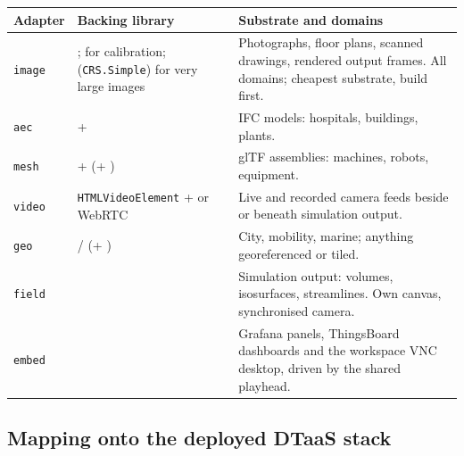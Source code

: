 \begin{longtable}{@{}L{1.9cm}L{5.2cm}L{7.4cm}@{}}
\toprule
\textbf{Adapter} & \textbf{Backing library} & \textbf{Substrate and domains} \\
\midrule
\endhead
\texttt{image} & ;  for calibration; 
(\texttt{CRS.Simple}) for very large images & Photographs, floor plans, scanned
drawings, rendered output frames. All domains; cheapest substrate, build first. \\
\addlinespace
\texttt{aec} &  +  & IFC models:
hospitals, buildings, plants. \\
\addlinespace
\texttt{mesh} &  +  (+ ) & glTF
assemblies: machines, robots, equipment. \\
\addlinespace
\texttt{video} & \texttt{HTMLVideoElement} +  or WebRTC & Live and recorded
camera feeds beside or beneath simulation output. \\
\addlinespace
\texttt{geo} &  /  (+ ) & City,
mobility, marine; anything georeferenced or tiled. \\
\addlinespace
\texttt{field} &  & Simulation output: volumes, isosurfaces, streamlines.
Own canvas, synchronised camera. \\
\addlinespace
\texttt{embed} &  & Grafana panels, ThingsBoard dashboards and the
workspace VNC desktop, driven by the shared playhead. \\
\bottomrule
\end{longtable}

\subsection{Mapping onto the deployed DTaaS stack}
\label{sec:stack}

